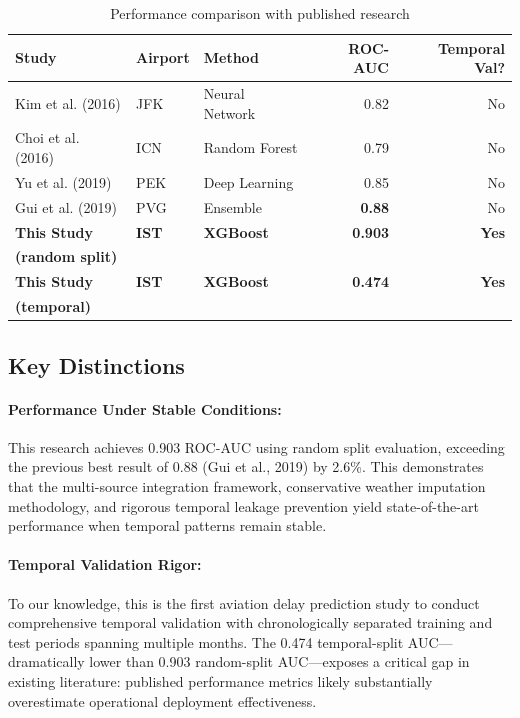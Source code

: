 \documentclass{report}
\begin{document}
\begin{table}[h]
\centering
\caption{Performance comparison with published research}
\label{tab:literature_comparison}
\begin{tabular}{lllrr}
\toprule
\textbf{Study} & \textbf{Airport} & \textbf{Method} & \textbf{ROC-AUC} & \textbf{Temporal Val?} \\
\midrule
Kim et al. (2016) & JFK & Neural Network & 0.82 & No \\
Choi et al. (2016) & ICN & Random Forest & 0.79 & No \\
Yu et al. (2019)& PEK & Deep Learning & 0.85 & No \\
Gui et al. (2019) & PVG & Ensemble & \textbf{0.88} & No \\
\midrule
\textbf{This Study} & \textbf{IST} & \textbf{XGBoost} & \textbf{0.903} & \textbf{Yes} \\
\textbf{(random split)} & & & & \\
\textbf{This Study} & \textbf{IST} & \textbf{XGBoost} & \textbf{0.474} & \textbf{Yes} \\
\textbf{(temporal)} & & & & \\
\bottomrule
\end{tabular}
\end{table}

\subsection{Key Distinctions}

\paragraph{Performance Under Stable Conditions:} This research achieves 0.903 ROC-AUC using random split evaluation, exceeding the previous best result of 0.88 (Gui et al., 2019) by 2.6\%. This demonstrates that the multi-source integration framework, conservative weather imputation methodology, and rigorous temporal leakage prevention yield state-of-the-art performance when temporal patterns remain stable.

\paragraph{Temporal Validation Rigor:} To our knowledge, this is the first aviation delay prediction study to conduct comprehensive temporal validation with chronologically separated training and test periods spanning multiple months. The 0.474 temporal-split AUC—dramatically lower than 0.903 random-split AUC—exposes a critical gap in existing literature: published performance metrics likely substantially overestimate operational deployment effectiveness.
\end{document}
